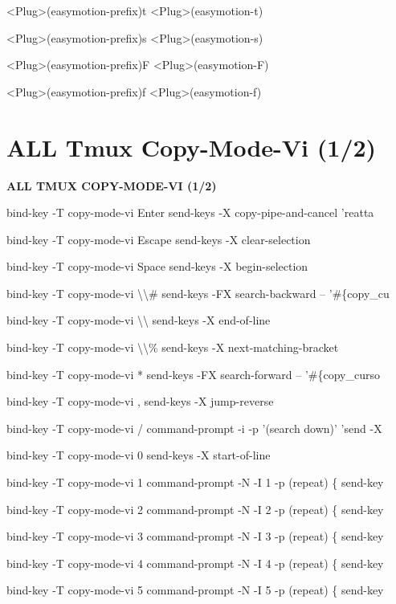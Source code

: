 \documentclass[11pt,a4paper,twoside]{book}
\begin{document}
<Plug>(easymotion-prefix)t  <Plug>(easymotion-t)

<Plug>(easymotion-prefix)s  <Plug>(easymotion-s)

<Plug>(easymotion-prefix)F  <Plug>(easymotion-F)

<Plug>(easymotion-prefix)f  <Plug>(easymotion-f)


\vspace{16pt}

\section{ALL Tmux Copy-Mode-Vi (1/2)}


\vspace{10pt}
{\large\bfseries\color{neoncyan} ALL TMUX COPY-MODE-VI (1/2)}\vspace{6pt}

bind-key  -T copy-mode-vi Enter  send-keys -X copy-pipe-and-cancel 'reatta

bind-key  -T copy-mode-vi Escape  send-keys -X clear-selection

bind-key  -T copy-mode-vi Space  send-keys -X begin-selection

bind-key  -T copy-mode-vi \textbackslash{}\textbackslash{}\#  send-keys -FX search-backward -- '\#\{copy\_cu

bind-key  -T copy-mode-vi \textbackslash{}\textbackslash{}  send-keys -X end-of-line

bind-key  -T copy-mode-vi \textbackslash{}\textbackslash{}\%  send-keys -X next-matching-bracket

bind-key  -T copy-mode-vi *  send-keys -FX search-forward -- '\#\{copy\_curso

bind-key  -T copy-mode-vi ,  send-keys -X jump-reverse

bind-key  -T copy-mode-vi /  command-prompt -i -p '(search down)' 'send -X

bind-key  -T copy-mode-vi 0  send-keys -X start-of-line

bind-key  -T copy-mode-vi 1  command-prompt -N -I 1 -p (repeat) \{ send-key

bind-key  -T copy-mode-vi 2  command-prompt -N -I 2 -p (repeat) \{ send-key

bind-key  -T copy-mode-vi 3  command-prompt -N -I 3 -p (repeat) \{ send-key

bind-key  -T copy-mode-vi 4  command-prompt -N -I 4 -p (repeat) \{ send-key

bind-key  -T copy-mode-vi 5  command-prompt -N -I 5 -p (repeat) \{ send-key
\end{document}
